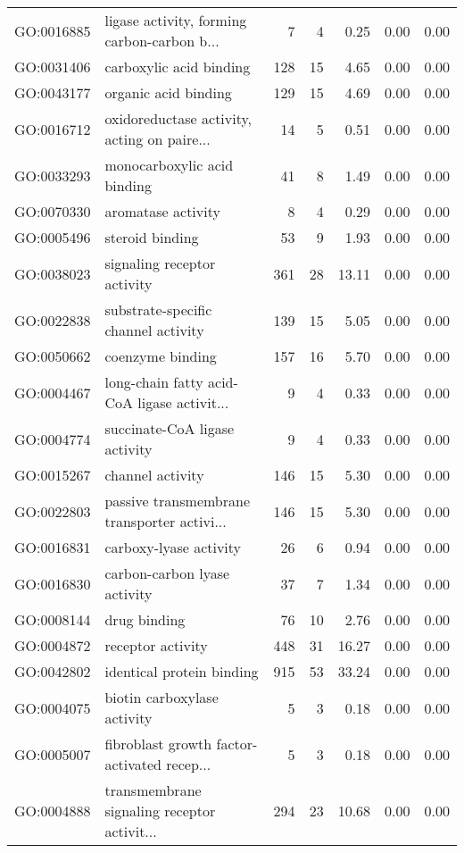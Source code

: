 \begin{table}[ht]
\begin{tabular}{llrrrrr}
  GO:0016885 & ligase activity, forming carbon-carbon b... &   7 &   4 & 0.25 & 0.00 & 0.00 \\ 
  GO:0031406 & carboxylic acid binding & 128 &  15 & 4.65 & 0.00 & 0.00 \\ 
  GO:0043177 & organic acid binding & 129 &  15 & 4.69 & 0.00 & 0.00 \\ 
  GO:0016712 & oxidoreductase activity, acting on paire... &  14 &   5 & 0.51 & 0.00 & 0.00 \\ 
  GO:0033293 & monocarboxylic acid binding &  41 &   8 & 1.49 & 0.00 & 0.00 \\ 
  GO:0070330 & aromatase activity &   8 &   4 & 0.29 & 0.00 & 0.00 \\ 
  GO:0005496 & steroid binding &  53 &   9 & 1.93 & 0.00 & 0.00 \\ 
  GO:0038023 & signaling receptor activity & 361 &  28 & 13.11 & 0.00 & 0.00 \\ 
  GO:0022838 & substrate-specific channel activity & 139 &  15 & 5.05 & 0.00 & 0.00 \\ 
  GO:0050662 & coenzyme binding & 157 &  16 & 5.70 & 0.00 & 0.00 \\ 
  GO:0004467 & long-chain fatty acid-CoA ligase activit... &   9 &   4 & 0.33 & 0.00 & 0.00 \\ 
  GO:0004774 & succinate-CoA ligase activity &   9 &   4 & 0.33 & 0.00 & 0.00 \\ 
  GO:0015267 & channel activity & 146 &  15 & 5.30 & 0.00 & 0.00 \\ 
  GO:0022803 & passive transmembrane transporter activi... & 146 &  15 & 5.30 & 0.00 & 0.00 \\ 
  GO:0016831 & carboxy-lyase activity &  26 &   6 & 0.94 & 0.00 & 0.00 \\ 
  GO:0016830 & carbon-carbon lyase activity &  37 &   7 & 1.34 & 0.00 & 0.00 \\ 
  GO:0008144 & drug binding &  76 &  10 & 2.76 & 0.00 & 0.00 \\ 
  GO:0004872 & receptor activity & 448 &  31 & 16.27 & 0.00 & 0.00 \\ 
  GO:0042802 & identical protein binding & 915 &  53 & 33.24 & 0.00 & 0.00 \\ 
  GO:0004075 & biotin carboxylase activity &   5 &   3 & 0.18 & 0.00 & 0.00 \\ 
  GO:0005007 & fibroblast growth factor-activated recep... &   5 &   3 & 0.18 & 0.00 & 0.00 \\ 
  GO:0004888 & transmembrane signaling receptor activit... & 294 &  23 & 10.68 & 0.00 & 0.00 \\ 

\end{tabular}
\end{table}
